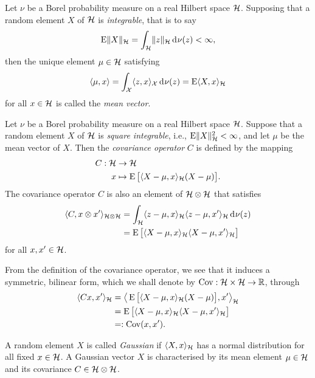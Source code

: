 \begin{definition}
  Let $\nu$ be a Borel probability measure on a real Hilbert space ${\mathcal H}$.
  Supposing that a random element $X$ of ${\mathcal H}$ is \emph{integrable}, that is to say
  \[
    \operatorname{E} \lVert X\rVert_{\mathcal H} = \int_{\mathcal H} \lVert z\rVert_{\mathcal H} \operatorname{d}\hspace{0.5pt}\!\nu(z) < \infty,
  \]
  then the unique element $\mu\in{\mathcal H}$ satisfying 
  \[
    \langle\mu,x\rangle = \int_{\mathcal X} \langle z,x\rangle_{\mathcal X} \operatorname{d}\hspace{0.5pt}\!\nu(z) = \operatorname{E}\langle X,x\rangle_{\mathcal H}
  \]
  for all $x \in {\mathcal H}$ is called the \emph{mean vector}. 
\end{definition}

\begin{definition}\label{def:covoper}
  Let $\nu$ be a Borel probability measure on a real Hilbert space ${\mathcal H}$.
  Suppose that a random element $X$ of ${\mathcal H}$ is \emph{square integrable}, i.e., $\operatorname{E} \lVert X\rVert_{\mathcal H}^2 < \infty$, and let $\mu$ be the mean vector of $X$.
  Then the \emph{covariance operator} $C$ is defined by the mapping
  \begin{align*}
    C:{\mathcal H} &\to {\mathcal H} \\
    x &\mapsto \operatorname{E}\big[\langle X - \mu, x\rangle_{{\mathcal H}}(X - \mu) \big].
  \end{align*}
  The covariance operator $C$ is also an element of ${\mathcal H}\otimes{\mathcal H}$ that satisfies
  \begin{align*}
    \langle C,x\otimes x'\rangle_{{\mathcal H}\otimes{\mathcal H}} 
    &= \int_{\mathcal H} \langle z-\mu, x\rangle_{\mathcal H}\langle z-\mu,x'\rangle_{\mathcal H} \operatorname{d}\hspace{0.5pt}\!\nu(z) \\
    &= \operatorname{E}\big[\langle X-\mu,x\rangle_{\mathcal H} \langle X-\mu,x'\rangle_{\mathcal H}\big]
  \end{align*}
  for all $x,x'\in{\mathcal H}$.
\end{definition}

From the definition of the covariance operator, we see that it induces a symmetric, bilinear form, which we shall denote by $\operatorname{Cov}:{\mathcal H}\times{\mathcal H}\to\mathbb{R}$, through
\begin{align*}
  \langle Cx,x'\rangle_{\mathcal H} 
  &= \big\langle\operatorname{E}\big[\langle X - \mu, x\rangle_{{\mathcal H}}(X - \mu) \big], x' \big\rangle_{\mathcal H} \\
  &= \operatorname{E}\big[\langle X-\mu,x\rangle_{\mathcal H} \langle X-\mu,x'\rangle_{\mathcal H}\big] \\
  &=: \operatorname{Cov}(x,x').
\end{align*}

\begin{definition}
  A random element $X$ is called \emph{Gaussian} if $\langle X,x\rangle_{\mathcal H}$ has a normal distribution for all fixed $x\in{\mathcal H}$.
  A Gaussian vector $X$ is characterised by its mean element $\mu\in{\mathcal H}$ and its covariance $C\in{\mathcal H}\otimes{\mathcal H}$.
\end{definition}
